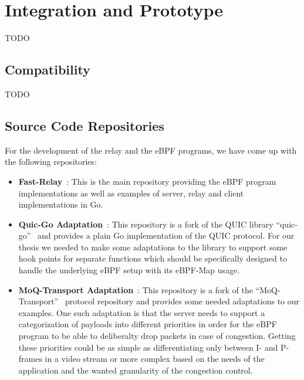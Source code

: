 \section{Integration and Prototype}\label{sec:integration_and_prototype}
TODO

\subsection{Compatibility}
TODO

\subsection{Source Code Repositories}\label{sec:source_code_repos}
For the development of the relay and the eBPF programs, we have come up with the following repositories:
\begin{itemize}

    \item \textbf{Fast-Relay}~\parencite{adaptive-moq-repo}:
    This is the main repository providing the eBPF program implementations as well as examples of 
    server, relay and client implementations in Go.
    
    \item \textbf{Quic-Go Adaptation}~\parencite{quic-go-prio-packs-repo}:
    This repository is a fork of the QUIC library ``quic-go''~\parencite{quic-go-repo} and provides a 
    plain Go implementation of the QUIC protocol.
    For our thesis we needed to make some adaptations to the library to support some hook points for 
    separate functions which should be specifically designed to handle the underlying eBPF setup with its eBPF-Map usage. 
    
    \item \textbf{MoQ-Transport Adaptation}~\parencite{priority-moqtransport-repo}:
    This repository is a fork of the ``MoQ-Transport''~\parencite{draft-moqtransport} protocol repository and provides
    some needed adaptations to our examples. One such adaptation is that the server needs to support a 
    categorization of payloads into different priorities in order for the eBPF program to be able to 
    deliberalty drop packets in case of congestion.
    Getting these priorities could be as simple as differentiating only between I- and P-frames in a video 
    stream or more complex based on the needs of the application and the wanted granularity of the congestion 
    control.
    
\end{itemize}